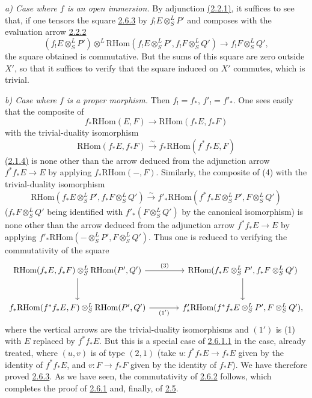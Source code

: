 \documentclass[11pt]{article}
\providecommand{\RHom}{\mathrm{RHom}}
\providecommand{\RHom}{\mathrm{RHom}}
\providecommand{\RHom}{\mathrm R\mathcal{H}om}
\providecommand{\RHom}{\mathrm{RHom}}
\begin{document}
\emph{a) Case where $f$ is an open immersion.} By adjunction \hyperref[sga5:III:equation:2.2.1]{(2.2.1)}, it suffices to see that, if one tensors the square \hyperref[sga5:III:lemma:2.6.3]{2.6.3} by $f_!E\otimes^L_SP'$ and composes with the evaluation arrow \hyperref[sga5:III:equation:2.2.2]{2.2.2}
\[
(f_!E\otimes^L_SP')\otimes^L\RHom(f_!E\otimes^L_SP',f_!F\otimes^L_SQ')\longrightarrow f_!F\otimes^L_SQ',
\]
the square obtained is commutative. But the sums of this square are zero outside $X'$, so that it suffices to verify that the square induced on $X'$ commutes, which is trivial.

\emph{b) Case where $f$ is a proper morphism.} Then $f_!=f_*$, $f'_!=f'_*$. One sees easily that the composite of
\[
f_*\RHom(E,F)\longrightarrow\RHom(f_*E,f_*F)
\]
with the trivial-duality isomorphism
\[
\RHom(f_*E,f_*F)\xrightarrow{\sim}f_*\RHom(f^{*}f_*E,F)
\]
\hyperref[sga5:III:equation:2.1.4]{(2.1.4)} is none other than the arrow deduced from the adjunction arrow $f^{*}f_*E\to E$ by applying $f_*\RHom(-,F)$. Similarly, the composite of (4) with the trivial-duality isomorphism
\[
\RHom(f_*E\otimes^L_SP',f_*F\otimes^L_SQ')\xrightarrow{\sim}f'_*\RHom(f^{*}f_*E\otimes^L_SP',F\otimes^L_SQ')
\]
($f_*F\otimes^L_SQ'$ being identified with $f'_*(F\otimes^L_SQ')$ by the canonical isomorphism) is none other than the arrow deduced from the adjunction arrow $f^{*}f_*E\to E$ by applying $f'_*\RHom(-\otimes^L_SP',F\otimes^L_SQ')$. Thus one is reduced to verifying the commutativity of the square
\[
\begin{tikzcd}[column sep=large,row sep=large]
\RHom(f_*E,f_*F)\otimes^L_S\RHom(P',Q') \arrow[r,"(3)"] \arrow[d] & \RHom(f_*E\otimes^L_SP',f_*F\otimes^L_SQ') \arrow[d]\\
f_*\RHom(f^{*}f_*E,F)\otimes^L_S\RHom(P',Q') \arrow[r,"(1')"'] & f'_*\RHom(f^{*}f_*E\otimes^L_SP',F\otimes^L_SQ'),
\end{tikzcd}
\]
where the vertical arrows are the trivial-duality isomorphisms and $(1')$ is (1) with $E$ replaced by $f^{*}f_*E$. But this is a special case of \hyperref[sga5:III:equation:2.6.1.1]{2.6.1.1} in the case, already treated, where $(u,v)$ is of type $(2,1)$ (take $u:f^{*}f_*E\to f_*E$ given by the identity of $f^{*}f_*E$, and $v:F\to f_*F$ given by the identity of $f_*F$). We have therefore proved \hyperref[sga5:III:lemma:2.6.3]{2.6.3}. As we have seen, the commutativity of \hyperref[sga5:III:equation:2.6.2]{2.6.2} follows, which completes the proof of \hyperref[sga5:III:corollary:2.6.1]{2.6.1} and, finally, of \hyperref[sga5:III:proposition:2.5]{2.5}.
\end{document}
